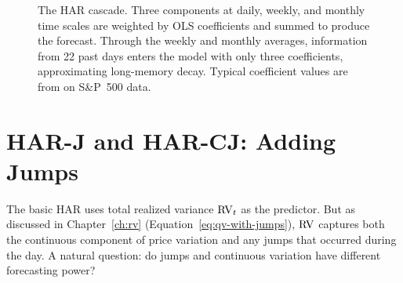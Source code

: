 \begin{figure}[htbp]
\caption{The HAR cascade.
Three components at daily, weekly, and monthly time scales are weighted by OLS coefficients and summed to produce the forecast.
Through the weekly and monthly averages, information from 22 past days enters the model with only three coefficients, approximating long-memory decay.
Typical coefficient values are from \citet{Corsi2009} on S\&P~500 data.}
\label{fig:har-cascade}
\end{figure}


\section{HAR-J and HAR-CJ: Adding Jumps}
\label{sec:har-j}

The basic HAR uses total realized variance $\operatorname{RV}_t$ as the predictor.
But as discussed in Chapter~\ref{ch:rv} (Equation~\ref{eq:qv-with-jumps}), $\operatorname{RV}$ captures both the continuous component of price variation and any jumps that occurred during the day.
A natural question: do jumps and continuous variation have different forecasting power?

